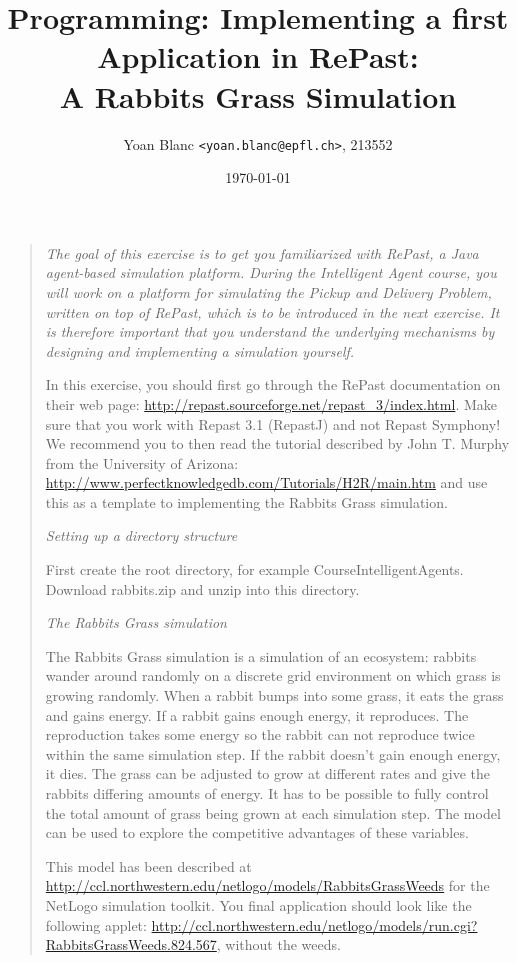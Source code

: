 \documentclass[10pt,a4paper]{article}
\title{\phantomsection%
    Programming: Implementing a first Application in RePast:\\
    A Rabbits Grass Simulation
}
\author{
    Yoan Blanc \texttt{<yoan.blanc@epfl.ch>}, 213552\\
}
\date{\today}
\begin{document}
\maketitle

\noindent
\begin{quote}{\it
    The goal of this exercise is to get you familiarized with \emph{RePast}, a Java
    agent-based simulation platform. During the Intelligent Agent course, you
    will work on a platform for simulating the Pickup and Delivery Problem,
    written on top of RePast, which is to be introduced in the next exercise.
    It is therefore important that you understand the underlying mechanisms by
    designing and implementing a simulation yourself.

    In this exercise, you should first go through the RePast documentation on
    their web page: \url{http://repast.sourceforge.net/repast_3/index.html}. Make
    sure that you work with Repast 3.1 (RepastJ) and not Repast Symphony! We
    recommend you to then read the tutorial described by John T. Murphy from
    the University of Arizona:
    \url{http://www.perfectknowledgedb.com/Tutorials/H2R/main.htm} and use this as a
    template to implementing the Rabbits Grass simulation.

    \medskip
    \emph{Setting up a directory structure}

    First create the root directory, for example CourseIntelligentAgents.
    Download rabbits.zip and unzip into this directory.

    \medskip
    \emph{The Rabbits Grass simulation}

    The Rabbits Grass simulation is a simulation of an ecosystem: rabbits
    wander around randomly on a discrete grid environment on which grass is
    growing randomly. When a rabbit bumps into some grass, it eats the grass
    and gains energy. If a rabbit gains enough energy, it reproduces. The
    reproduction takes some energy so the rabbit can not reproduce twice within
    the same simulation step. If the rabbit doesn't gain enough energy, it
    dies. The grass can be adjusted to grow at different rates and give the
    rabbits differing amounts of energy. It has to be possible to fully control
    the total amount of grass being grown at each simulation step. The model
    can be used to explore the competitive advantages of these variables.

    This model has been described at
    \url{http://ccl.northwestern.edu/netlogo/models/RabbitsGrassWeeds} for the
    NetLogo simulation toolkit. You final application should look like the
    following applet:
    \url{http://ccl.northwestern.edu/netlogo/models/run.cgi?RabbitsGrassWeeds.824.567},
    without the weeds.

}
\end{quote}
\end{document}
